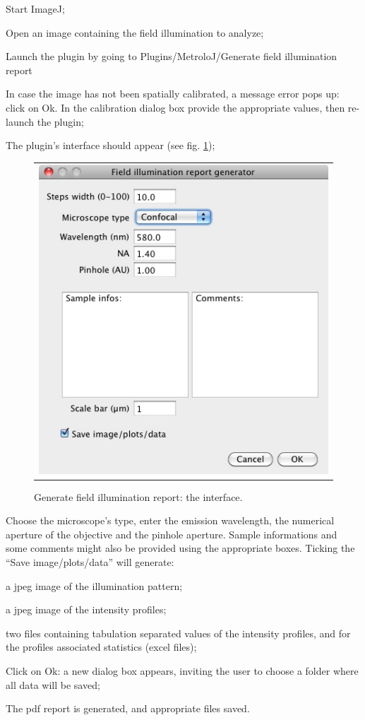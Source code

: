 \documentclass[a4paper, 11pt]{report}%
\begin{document}
\begin{enumerate*}
	\item Start ImageJ;
	\item Open an image containing the field illumination to analyze;
	\item Launch the plugin by going to Plugins/MetroloJ/Generate field illumination report
	\item In case the image has not been spatially calibrated, a message error pops up: click on Ok. In the calibration dialog box provide the appropriate values, then re-launch the plugin;
	\item The plugin's interface should appear (see fig. \ref{fig:gfir-interf}); 
		\begin{figure}[!ht]
			\begin{center}
				\begin{tabular}{c}
					\includegraphics[width=0.35\linewidth]{img/gfir-interf}
				\end{tabular}
			\end{center}
			\caption{\label{fig:gfir-interf}Generate field illumination report: the interface.}
		\end{figure} 
	\item Choose the microscope's type, enter the emission wavelength, the numerical aperture of the objective and the pinhole aperture. Sample informations and some comments might also be provided using the appropriate boxes. Ticking the ``Save image/plots/data'' will generate:
	\begin{itemize*}
		\item a jpeg image of the illumination pattern;
		\item a jpeg image of the intensity profiles;
		\item two files containing tabulation separated values of the intensity profiles, and for the profiles associated statistics (excel files);
	\end{itemize*}
	\item Click on Ok: a new dialog box appears, inviting the user to choose a folder where all data will be saved;
	\item The pdf report is generated, and appropriate files saved.
\end{enumerate*}
\end{document}

